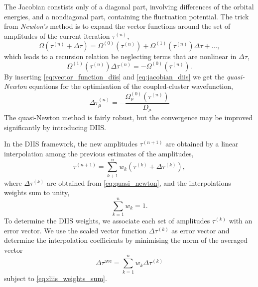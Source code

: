     The Jacobian constists only of a diagonal part, involving differences of the 
    orbital energies, and a nondiagonal part, containing the fluctuation potential.
    The trick from \emph{Newton's} method is to expand the vector functions around 
    the set of amplitudes of the current iteration $\tau^{(n)}$,
    \begin{equation}
        \Omega(\tau^{(n)} + \Delta\tau) = \Omega^{(0)}(\tau^{(n)})
            + \Omega^{(1)}(\tau^{(n)})\Delta \tau + \dots,
    \end{equation}
    which leads to a recursion relation be neglecting terms that are nonlinear in
    $\Delta \tau$,
    \begin{equation}
        \Omega^{(1)}(\tau^{(n)})\Delta \tau^{(n)} = - \Omega^{(0)}(\tau^{(n)}).
    \end{equation}
    By inserting \autoref{eq:vector_function_diis} and \autoref{eq:jacobian_diis} 
    we get the \emph{quasi-Newton} equations for the optimisation of the 
    coupled-cluster wavefunction,
    \begin{equation}
        \label{eq:quasi_newton}
        \Delta \tau^{(n)}_\mu = - \frac{\Omega^{(0)}_\mu(\tau^{(n)})}{D_\mu}
    \end{equation}
    The quasi-Newton method is fairly robust, but the convergence may be improved 
    significantly by introducing DIIS.

    In the DIIS framework\cite{pulay1980convergence}, the new amplitudes 
    $\tau^{(n+1)}$ are obtained by a linear interpolation among the previous 
    estimates of the amplitudes,
    \begin{equation}
        \tau^{(n+1)} = \sum_{k+1}^n w_k(\tau^{(k)} + \Delta\tau^{(k)}),
    \end{equation}
    where $\Delta\tau^{(k)}$ are obtained from \autoref{eq:quasi_newton}, and 
    the interpolations weights sum to unity,
    \begin{equation*}
        \label{eq:diis_weights_sum}
        \sum_{k=1}^n w_k = 1.
    \end{equation*}
    To determine the DIIS weights, we associate each set of amplitudes $\tau^{(k)}$ 
    with an error vector. We use the scaled vector function $\Delta\tau^{(k)}$ as 
    error vector and determine the interpolation coefficients by minimising the norm of 
    the averaged vector
    \begin{equation}
        \Delta \tau^{\text{ave}} = \sum_{k=1}^n w_k \Delta \tau^{(k)}
    \end{equation}
    subject to \autoref{eq:diis_weights_sum}.

